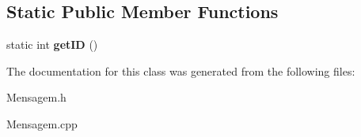 \subsection*{Static Public Member Functions}
\begin{DoxyCompactItemize}
\item 
\hypertarget{class_mensagem_aedda3752e5473856e88644839a16fb10}{}static int {\bfseries get\+I\+D} ()\label{class_mensagem_aedda3752e5473856e88644839a16fb10}

\end{DoxyCompactItemize}


The documentation for this class was generated from the following files\+:\begin{DoxyCompactItemize}
\item 
Mensagem.\+h\item 
Mensagem.\+cpp\end{DoxyCompactItemize}

